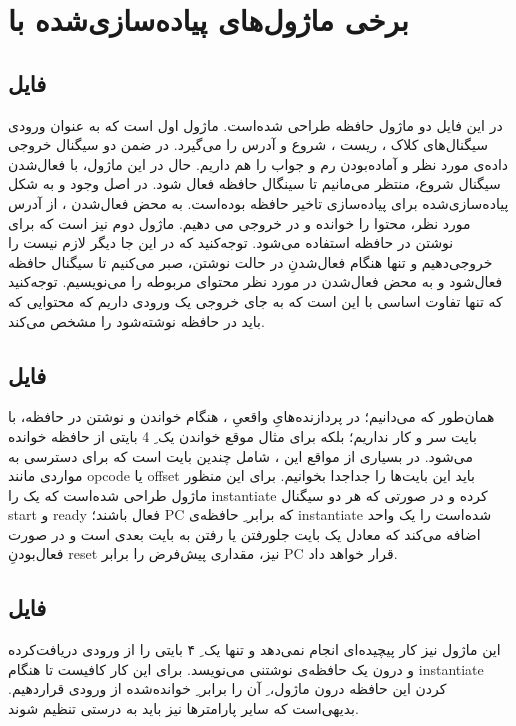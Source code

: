 \section*{
	برخی ماژول‌های پیاده‌سازی‌شده با
}

\subsection*{فایل 
}
در این فایل دو ماژول حافظه طراحی شده‌است. ماژول اول
است که به عنوان ورودی سیگنال‌های کلاک
، ریست
، شروع
و آدرس
را می‌گیرد. در ضمن دو سیگنال خروجی داده‌ی مورد نظر
و آماده‌بودن رم و جواب
را هم داریم. حال در این ماژول، با فعال‌شدن سیگنال شروع، منتظر می‌مانیم تا سینگال 
حافظه فعال شود.
در اصل وجود
و 
به شکل پیاده‌سازی‌شده برای پیاده‌سازی تاخیر حافظه بوده‌است.
به محض فعال‌شدن
،
از آدرس مورد نظر، محتوا را خوانده و در 
خروجی می
دهیم.
ماژول دوم نیز
است که برای نوشتن در حافظه استفاده می‌شود.
توجه‌کنید که در این جا دیگر لازم نیست
را خروجی‌دهیم و تنها هنگام
فعال‌شدنِ
در حالت نوشتن، صبر می‌کنیم تا سیگنال
حافظه فعال‌شود و به محض فعال‌شدن در
مورد نظر محتوای مربوطه را می‌نویسیم. توجه‌کنید که تنها تفاوت اساسی با
این است که به جای خروجی
یک ورودی
داریم که محتوایی که باید در حافظه نوشته‌شود را مشخص می‌کند.
\subsection*{
	فایل
}
همان‌طور که می‌دانیم؛ در پردازنده‌هایِ واقعیِ
،
هنگام خواندن و نوشتن در حافظه، با بایت سر و کار نداریم؛ بلکه برای مثال موقع خواندن یک
ِ
4	 بایتی از حافظه خوانده می‌شود. در بسیاری از مواقع این
،
شامل چندین بایت است که برای دسترسی به مواردی مانند opcode یا offset باید این بایت‌ها را جداجدا بخوانیم. برای این منظور ماژول
طراحی شده‌است که یک
را instantiate کرده و در صورتی که هر دو سیگنال start و ready فعال باشند؛ PC که برابر
ِ
حافظه‌ی instantiate شده‌است را یک واحد اضافه می‌کند که معادل یک بایت جلورفتن یا رفتن به بایت بعدی است و در صورت فعال‌بودنِ reset نیز، مقداری پیش‌فرض را برابر PC قرار خواهد داد.
\subsection*{فایل
	}
این ماژول نیز کار پیچیده‌ای انجام نمی‌دهد و تنها یک
ِ
۴ بایتی را از ورودی دریافت‌کرده و درون یک حافظه‌ی نوشتنی
می‌نویسد. برای این کار کافیست تا هنگام instantiate کردن این حافظه درون ماژول،
ِ
آن را برابر 
ِ
خوانده‌شده از ورودی قراردهیم. بدیهی‌است که سایر پارامترها نیز باید به درستی تنظیم شوند.
